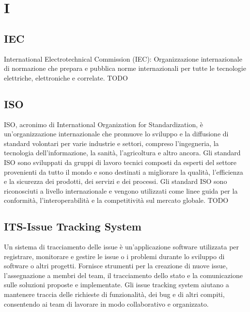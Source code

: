 \section{I}

\vspace{2em}
\subsection*{IEC}
International Electrotechnical Commission (IEC): Organizzazione internazionale di normazione che prepara e pubblica norme internazionali per tutte le tecnologie elettriche, elettroniche e correlate.
TODO

\vspace{2em}
\subsection*{ISO}
ISO, acronimo di International Organization for Standardization, è un'organizzazione internazionale che promuove lo sviluppo e la diffusione di standard volontari per varie industrie e settori, compreso l'ingegneria, la tecnologia dell'informazione, la sanità, l'agricoltura e altro ancora. Gli standard ISO sono sviluppati da gruppi di lavoro tecnici composti da esperti del settore provenienti da tutto il mondo e sono destinati a migliorare la qualità, l'efficienza e la sicurezza dei prodotti, dei servizi e dei processi. Gli standard ISO sono riconosciuti a livello internazionale e vengono utilizzati come linee guida per la conformità, l'interoperabilità e la competitività sul mercato globale.
TODO

\vspace{2em}
\subsection*{ITS-Issue Tracking System}
Un sistema di tracciamento delle issue è un'applicazione software utilizzata per registrare, monitorare e gestire le issue o i problemi durante lo sviluppo di software o altri progetti. Fornisce strumenti per la creazione di nuove issue, l'assegnazione a membri del team, il tracciamento dello stato e la comunicazione sulle soluzioni proposte e implementate. Gli issue tracking system aiutano a mantenere traccia delle richieste di funzionalità, dei bug e di altri compiti, consentendo ai team di lavorare in modo collaborativo e organizzato.
